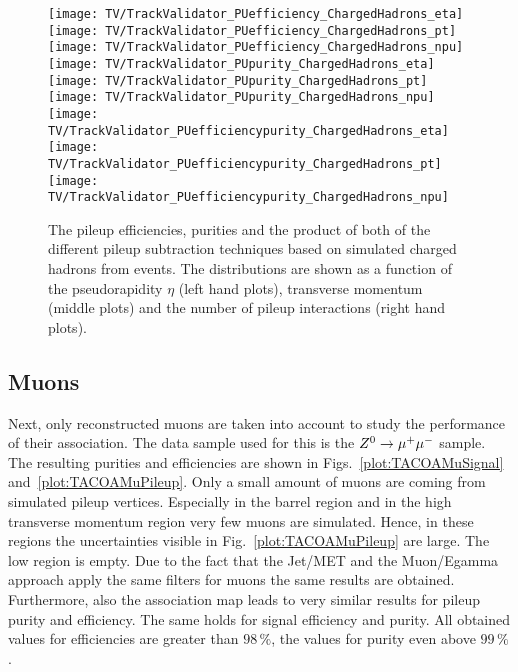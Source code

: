 \begin{figure}[Hb]
    \centering
    \texttt{[image: TV/TrackValidator\_PUefficiency\_ChargedHadrons\_eta]}
    \texttt{[image: TV/TrackValidator\_PUefficiency\_ChargedHadrons\_pt]}
    \texttt{[image: TV/TrackValidator\_PUefficiency\_ChargedHadrons\_npu]}
    \\
    \texttt{[image: TV/TrackValidator\_PUpurity\_ChargedHadrons\_eta]}
    \texttt{[image: TV/TrackValidator\_PUpurity\_ChargedHadrons\_pt]}
    \texttt{[image: TV/TrackValidator\_PUpurity\_ChargedHadrons\_npu]}
    \\
    \texttt{[image: TV/TrackValidator\_PUefficiencypurity\_ChargedHadrons\_eta]}
    \texttt{[image: TV/TrackValidator\_PUefficiencypurity\_ChargedHadrons\_pt]}
    \texttt{[image: TV/TrackValidator\_PUefficiencypurity\_ChargedHadrons\_npu]}
    \caption[Pileup efficiencies, purities and their product of the different pileup subtraction techniques based on simulated charged hadrons from \ttbar events]{The pileup efficiencies, purities and the product of both of the different pileup subtraction techniques based on simulated charged hadrons from \ttbar events. The distributions are shown as a function of the pseudorapidity $\eta$ (left hand plots), transverse momentum (middle plots) and the number of pileup interactions (right hand plots). \label{plot:TACOACHPileup}}
\end{figure}



\subsection{Muons \label{sec:TASEFRDAM}}

Next, only reconstructed muons are taken into account to study the performance of their association. The data sample used  for this is the ${Z^{0}}\rightarrow\mu^+\mu^-$ sample. The resulting purities and efficiencies are shown in Figs.~\ref{plot:TACOAMuSignal} and~\ref{plot:TACOAMuPileup}. Only a small amount of muons are coming from simulated pileup vertices. Especially in the barrel region and in the high transverse momentum region very few muons are simulated. Hence, in these regions the uncertainties visible in Fig.~\ref{plot:TACOAMuPileup} are large. The low \pt region is empty. Due to the fact that the Jet/MET and the Muon/Egamma approach apply the same filters for muons the same results are obtained. Furthermore, also the association map leads to very similar results for pileup purity and efficiency. The same holds for signal efficiency and purity. All obtained values for efficiencies are greater than $98\,\%$, the values for purity even above $99\,\%$.

